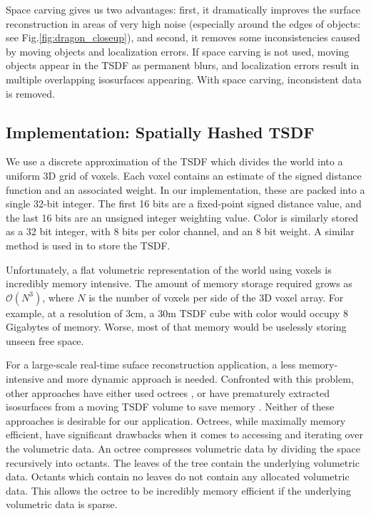 \documentclass[10pt,twocolumn,letterpaper]{article}
\newcommand{\figref}[1]{Fig.\ref{#1}}
\begin{document}
Space carving gives us two advantages: first, it dramatically improves the
surface reconstruction in areas of very high noise (especially around the edges
of objects: see \figref{fig:dragon_closeup}), and second, it removes
some inconsistencies caused by moving objects and localization errors. If space
carving is not used, moving objects appear in the TSDF as permanent blurs, and
localization errors result in multiple overlapping isosurfaces appearing. With
space carving, inconsistent data is removed.

\subsection{Implementation: Spatially Hashed TSDF}
We use a discrete approximation of the TSDF which divides the world into
a uniform 3D grid of voxels. Each voxel contains an estimate of the signed
distance function and an associated weight. In our implementation, these are
packed into a single 32-bit integer. The first 16 bits are a fixed-point
signed distance value, and the last 16 bits  are an unsigned integer weighting
value. Color is similarly stored as a 32 bit integer, with 8 bits per color 
channel, and an 8 bit weight. A similar method is used in \cite{Newcombe,
Whelan2013, Bylow2013} to store the TSDF.

Unfortunately, a flat volumetric representation of the world using voxels is
incredibly memory intensive. The amount of memory storage required grows as
$\mathcal{O}(N^3)$, where $N$ is the number of voxels per side of the 3D voxel
array. For example, at a resolution of $3\text{cm}$,  a $30\text{m}$ TSDF cube
with color would occupy 8 Gigabytes of memory. Worse, most of that memory would be
uselessly storing unseen free space.

For a large-scale real-time suface reconstruction application, a less
memory-intensive and more dynamic approach is needed. Confronted with this
problem, other approaches have either used  octrees \cite{Wurm2010}, or have
prematurely extracted isosurfaces from a moving TSDF volume to save memory
\cite{Whelan2013}. Neither of these approaches is desirable for our application.
Octrees, while maximally memory efficient, have significant drawbacks when it comes to
accessing and iterating over the volumetric data. An octree compresses
volumetric data by dividing the space recursively into octants. The leaves of
the tree contain the underlying volumetric data. Octants which contain no
leaves do not contain any allocated volumetric data. This allows the octree to
be incredibly memory efficient if the underlying volumetric data is sparse.
\end{document}
